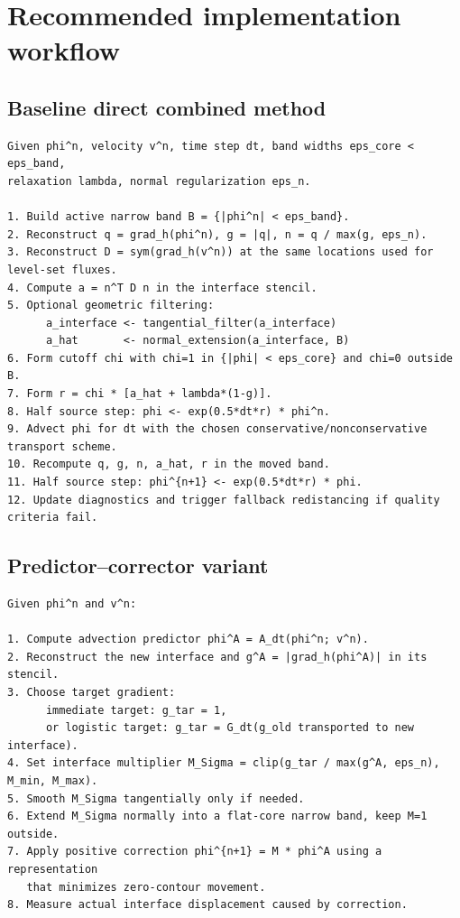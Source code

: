 \documentclass[11pt,a4paper]{article}
\theoremstyle{definition}
\theoremstyle{remark}
\begin{document}
\section{Recommended implementation workflow}

\subsection{Baseline direct combined method}

\begin{lstlisting}[style=pseudocode,caption={One time step of a direct combined-source level-set update.}]
Given phi^n, velocity v^n, time step dt, band widths eps_core < eps_band,
relaxation lambda, normal regularization eps_n.

1. Build active narrow band B = {|phi^n| < eps_band}.
2. Reconstruct q = grad_h(phi^n), g = |q|, n = q / max(g, eps_n).
3. Reconstruct D = sym(grad_h(v^n)) at the same locations used for level-set fluxes.
4. Compute a = n^T D n in the interface stencil.
5. Optional geometric filtering:
      a_interface <- tangential_filter(a_interface)
      a_hat       <- normal_extension(a_interface, B)
6. Form cutoff chi with chi=1 in {|phi| < eps_core} and chi=0 outside B.
7. Form r = chi * [a_hat + lambda*(1-g)].
8. Half source step: phi <- exp(0.5*dt*r) * phi^n.
9. Advect phi for dt with the chosen conservative/nonconservative transport scheme.
10. Recompute q, g, n, a_hat, r in the moved band.
11. Half source step: phi^{n+1} <- exp(0.5*dt*r) * phi.
12. Update diagnostics and trigger fallback redistancing if quality criteria fail.
\end{lstlisting}

\subsection{Predictor--corrector variant}

\begin{lstlisting}[style=pseudocode,caption={Advection-predictor multiplicative correction.}]
Given phi^n and v^n:

1. Compute advection predictor phi^A = A_dt(phi^n; v^n).
2. Reconstruct the new interface and g^A = |grad_h(phi^A)| in its stencil.
3. Choose target gradient:
      immediate target: g_tar = 1,
      or logistic target: g_tar = G_dt(g_old transported to new interface).
4. Set interface multiplier M_Sigma = clip(g_tar / max(g^A, eps_n), M_min, M_max).
5. Smooth M_Sigma tangentially only if needed.
6. Extend M_Sigma normally into a flat-core narrow band, keep M=1 outside.
7. Apply positive correction phi^{n+1} = M * phi^A using a representation
   that minimizes zero-contour movement.
8. Measure actual interface displacement caused by correction.
\end{lstlisting}
\end{document}
